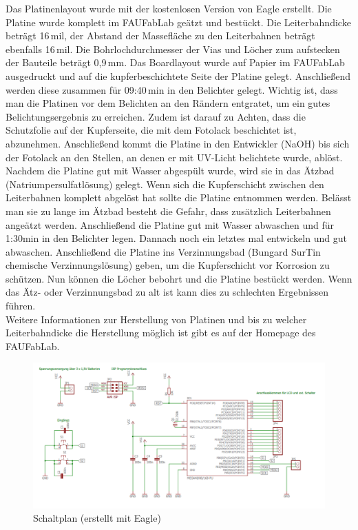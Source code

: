 Das Platinenlayout wurde mit der kostenlosen Version von Eagle erstellt. Die Platine wurde komplett im FAUFabLab geätzt und bestückt. Die Leiterbahndicke beträgt 16\,mil, der Abstand der Massefläche zu den Leiterbahnen beträgt ebenfalls 16\,mil. Die Bohrlochdurchmesser der Vias und Löcher zum aufstecken der Bauteile beträgt 0,9\,mm. Das Boardlayout wurde auf Papier im FAUFabLab ausgedruckt und auf die kupferbeschichtete Seite der Platine gelegt. Anschließend werden diese zusammen für 09:40\,min in den Belichter gelegt.  Wichtig ist, dass man die Platinen vor dem Belichten an den Rändern entgratet, um ein gutes Belichtungsergebnis zu erreichen. Zudem ist darauf zu Achten, dass die Schutzfolie auf der Kupferseite, die mit dem Fotolack beschichtet ist, abzunehmen. Anschließend kommt die Platine in den Entwickler (NaOH) bis sich der Fotolack an den Stellen, an denen er mit UV-Licht belichtete wurde, ablöst. Nachdem die Platine gut mit Wasser abgespült wurde, wird sie in das Ätzbad (Natriumpersulfatlösung) gelegt. Wenn sich die Kupferschicht zwischen den Leiterbahnen komplett abgelöst hat sollte die Platine entnommen werden. Belässt man sie zu lange im Ätzbad besteht die Gefahr, dass zusätzlich Leiterbahnen angeätzt werden. Anschließend die Platine gut mit Wasser abwaschen und für 1:30min in den Belichter legen. Dannach noch ein letztes mal entwickeln und gut abwaschen. Anschließend die Platine ins Verzinnungsbad (Bungard SurTin chemische Verzinnungslösung) geben, um die Kupferschicht vor Korrosion zu schützen. Nun können die Löcher bebohrt und die Platine bestückt werden.
Wenn das Ätz- oder Verzinnungsbad zu alt ist kann dies zu schlechten Ergebnissen führen.\\
Weitere Informationen zur Herstellung von Platinen und bis zu welcher Leiterbahndicke die Herstellung möglich ist gibt es auf der Homepage des FAUFabLab.

\begin{figure}[t]
  \centering
  \includegraphics[width=1\linewidth, keepaspectratio]{Bilder/DIYShematic}
  \caption{Schaltplan (erstellt mit Eagle)}
  \label{shematic}
\end{figure}

